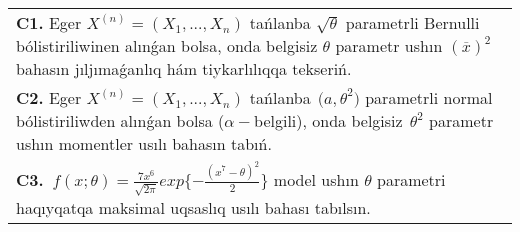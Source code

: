 \documentclass{article}
\begin{document}
\begin{tabular}{m{17cm}}
 \\
\textbf{C1.} 
Eger \(X^{(n)} = \left( X_{1},...,X_{n} \right)\) tańlanba \(\sqrt{\theta}\) parametrli Bernulli bólistiriliwinen alınǵan bolsa, onda belgisiz \(\theta\) parametr ushın \((\overline{x})^{2}\) bahasın jıljımaǵanlıq hám tiykarlılıqqa tekseriń.
 \\
\textbf{C2.} 
Eger \(X^{(n)} = \left( X_{1},...,X_{n} \right)\) tańlanba\({\ \ (a,\theta}^{2})\) parametrli normal bólistiriliwden alınǵan bolsa (\(\alpha -\)belgili), onda belgisiz\({\ \ \theta}^{2}\) parametr ushın momentler usılı bahasın tabıń.
 \\
\textbf{C3.} 
\(\ f(x;\theta) = \frac{7x^{6}}{\sqrt{2\pi}}exp\{ - \frac{(x^{7} - \theta)^{2}}{2}\}\) model ushın \(\theta\) parametri haqıyqatqa maksimal uqsaslıq usılı bahası tabılsın.
 \\

\end{tabular}
\vspace{1cm}
\end{document}
